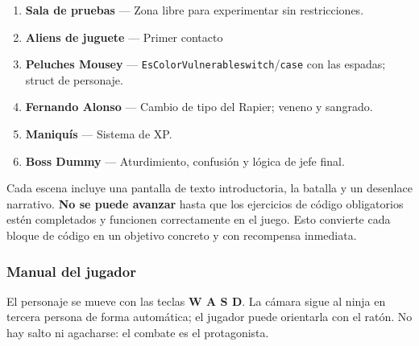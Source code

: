 \documentclass[a4paper,12pt]{article}
\newcounter{subsubsubsection}[subsubsection]
\begin{document}
\begin{enumerate}
  \item \textbf{Sala de pruebas} — Zona libre para experimentar sin restricciones.
  \item \textbf{Aliens de juguete} — Primer contacto%
  \item \textbf{Peluches Mousey} — \texttt{EsColorVulnerable}\texttt{switch}/\texttt{case} con las espadas; struct de personaje.
  \item \textbf{Fernando Alonso} — Cambio de tipo del Rapier; veneno y sangrado.
  \item \textbf{Maniquís} — Sistema de XP.
  \item \textbf{Boss Dummy} — Aturdimiento, confusión y lógica de jefe final.
\end{enumerate}

Cada escena incluye una pantalla de texto introductoria, la batalla y un desenlace narrativo.
\textbf{No se puede avanzar} hasta que los ejercicios de código obligatorios estén completados
y funcionen correctamente en el juego. Esto convierte cada bloque de código en un objetivo
concreto y con recompensa inmediata.

\subsubsection{Manual del jugador}


El personaje se mueve con las teclas \textbf{W A S D}. La cámara sigue al ninja en tercera
persona de forma automática; el jugador puede orientarla con el ratón. No hay salto ni agacharse:
el combate es el protagonista.

\end{document}
